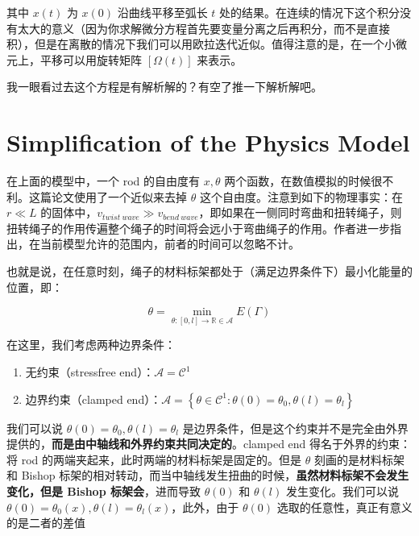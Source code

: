 \documentclass{notes}
\begin{document}
其中 $x(t)$ 为 $x(0)$ 沿曲线平移至弧长 $t$ 处的结果。在连续的情况下这个积分没有太大的意义（因为你求解微分方程首先要变量分离之后再积分，而不是直接积），但是在离散的情况下我们可以用欧拉迭代近似。值得注意的是，在一个小微元上，平移可以用旋转矩阵 $[\Omega(t)]$ 来表示。

\begin{remark}
	我一眼看过去这个方程是有解析解的？有空了推一下解析解吧。
\end{remark}

\section{Simplification of the Physics Model}

在上面的模型中，一个 rod 的自由度有 $x, \theta$ 两个函数，在数值模拟的时候很不利。这篇论文使用了一个近似来去掉 $\theta$ 这个自由度。注意到如下的物理事实：在 $r \ll L$ 的固体中，$v_{twist\ wave} \gg v_{bend\ wave}$，即如果在一侧同时弯曲和扭转绳子，则扭转绳子的作用传遍整个绳子的时间将会远小于弯曲绳子的作用。作者进一步指出，在当前模型允许的范围内，前者的时间可以忽略不计。

也就是说，在任意时刻，绳子的材料标架都处于（满足边界条件下）最小化能量的位置，即：

\begin{equation}\label{eq:minimize}
	\theta = \min_{\theta: [0, l] \rightarrow \mathbb{R} \in \mathcal{A}} E(\Gamma)
\end{equation}

在这里，我们考虑两种边界条件：

\begin{enumerate}
	\item 无约束（stressfree end）：$\mathcal{A} = \mathcal{C}^1$
	\item 边界约束（clamped end）：$\mathcal{A} = \left\lbrace \theta \in \mathcal{C}^1: \theta(0) = \theta_0, \theta(l) = \theta_l \right\rbrace$
\end{enumerate}

\begin{remark}
	我们可以说 $\theta(0) = \theta_0, \theta(l) = \theta_l$ 是边界条件，但是这个约束并不是完全由外界提供的，\textbf{而是由中轴线和外界约束共同决定的}。clamped end 得名于外界的约束：将 rod 的两端夹起来，此时两端的材料标架是固定的。但是 $\theta$ 刻画的是材料标架和 Bishop 标架的相对转动，而当中轴线发生扭曲的时候，\textbf{虽然材料标架不会发生变化，但是 Bishop 标架会}，进而导致 $\theta(0)$ 和 $\theta(l)$ 发生变化。我们可以说 $\theta(0) = \theta_0(x), \theta(l) = \theta_l(x)$，此外，由于 $\theta(0)$ 选取的任意性，真正有意义的是二者的差值
\end{remark}
\end{document}

